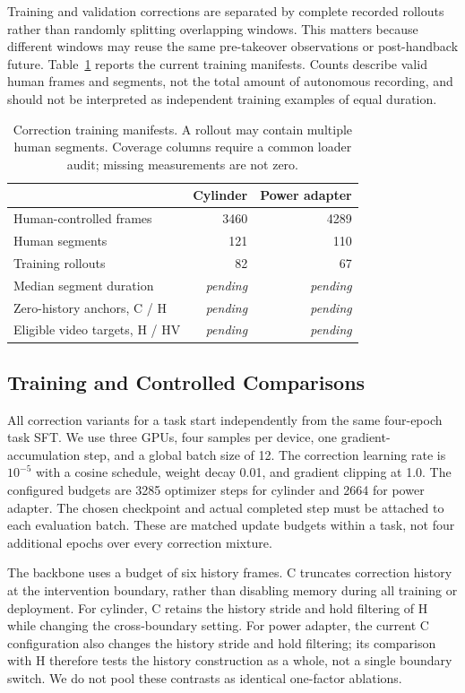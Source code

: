 \documentclass[letterpaper,10pt,conference]{ieeeconf}
\newcommand{\pending}{\textit{pending}}
\begin{document}
Training and validation corrections are separated by complete recorded rollouts rather than randomly splitting overlapping windows. This matters because different windows may reuse the same pre-takeover observations or post-handback future. Table~\ref{tab:data} reports the current training manifests. Counts describe valid human frames and segments, not the total amount of autonomous recording, and should not be interpreted as independent training examples of equal duration.

\begin{table}[t]
\centering\small
\caption{Correction training manifests. A rollout may contain multiple human segments. Coverage columns require a common loader audit; missing measurements are not zero.}
\label{tab:data}
\begin{tabularx}{\columnwidth}{@{}Xrr@{}}
\toprule
 & Cylinder & Power adapter \\
\midrule
Human-controlled frames & 3460 & 4289 \\
Human segments & 121 & 110 \\
Training rollouts & 82 & 67 \\
Median segment duration & \pending & \pending \\
Zero-history anchors, C / H & \pending & \pending \\
Eligible video targets, H / HV & \pending & \pending \\
\bottomrule
\end{tabularx}
\end{table}

\subsection{Training and Controlled Comparisons}
All correction variants for a task start independently from the same four-epoch task SFT. We use three GPUs, four samples per device, one gradient-accumulation step, and a global batch size of 12. The correction learning rate is $10^{-5}$ with a cosine schedule, weight decay 0.01, and gradient clipping at 1.0. The configured budgets are 3285 optimizer steps for cylinder and 2664 for power adapter. The chosen checkpoint and actual completed step must be attached to each evaluation batch. These are matched update budgets within a task, not four additional epochs over every correction mixture.

The backbone uses a budget of six history frames. C truncates correction history at the intervention boundary, rather than disabling memory during all training or deployment. For cylinder, C retains the history stride and hold filtering of H while changing the cross-boundary setting. For power adapter, the current C configuration also changes the history stride and hold filtering; its comparison with H therefore tests the history construction as a whole, not a single boundary switch. We do not pool these contrasts as identical one-factor ablations.
\end{document}
